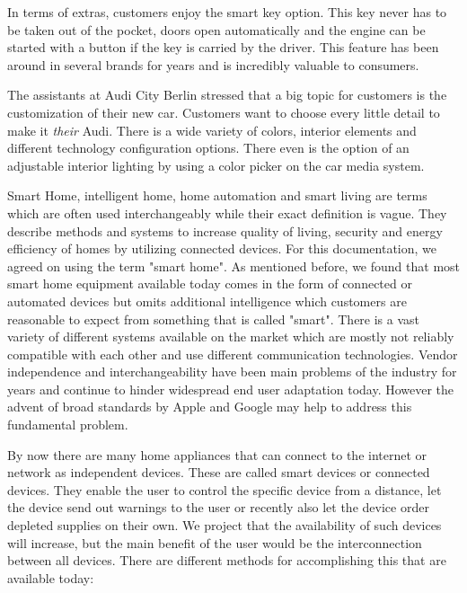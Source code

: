 In terms of extras, customers enjoy the smart key option. This key never has to be taken out of the pocket, doors open automatically and the engine can be started with a button if the key is carried by the driver. This feature has been around in several brands for years and is incredibly valuable to consumers.

The assistants at Audi City Berlin stressed that a big topic for customers is the customization of their new car. Customers want to choose every little detail to make it \textit{their} Audi. There is a wide variety of colors, interior elements and different technology configuration options. There even is the option of an adjustable interior lighting by using a color picker on the car media system.


Smart Home, intelligent home, home automation and smart living are terms which are often used interchangeably while their exact definition is vague. They describe methods and systems to increase quality of living, security and energy efficiency of homes by utilizing connected devices. For this documentation, we agreed on using the term "smart home". As mentioned before, we found that most smart home equipment available today comes in the form of connected or automated devices but omits additional intelligence which customers are reasonable to expect from something that is called "smart". There is a vast variety of different systems available on the market which are mostly not reliably compatible with each other and use different communication technologies. Vendor independence and interchangeability have been main problems of the industry for years and continue to hinder widespread end user adaptation today. However the advent of broad standards by Apple and Google may help to address this fundamental problem.

By now there are many home appliances that can connect to the internet or network as independent devices. These are called smart devices or connected devices. They enable the user to control the specific device from a distance, let the device send out warnings to the user or recently also let the device order depleted supplies on their own. We project that the availability of such devices will increase, but the main benefit of the user would be the interconnection between all devices. There are different methods for accomplishing this that are available today:

